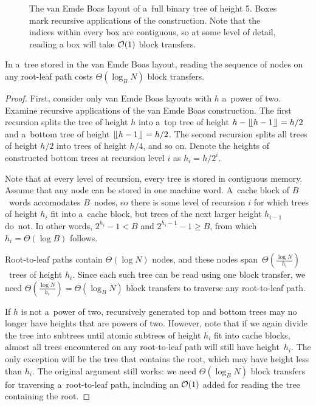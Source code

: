 \begin{figure}

\caption{The van Emde Boas layout of a~full binary tree of height 5.
Boxes mark recursive applications of the construction. Note that the indices
within every box are contiguous, so at some level of detail, reading
a box will take $\mathcal{O}(1)$ block transfers.}
\label{fig:veb_layout_5}
\end{figure}

\begin{theorem}
In a~tree stored in the van Emde Boas layout, reading the sequence of nodes
on any root-leaf path costs $\Theta(\log_B N)$ block transfers.
\end{theorem}

\begin{proof}
First, consider only van Emde Boas layouts with $h$ a~power of two.
Examine recursive applications of the van Emde Boas construction.
The first recursion splits the tree of height $h$ into a~top tree of height
$h-\lfloor \kern -0.22em \lfloor h-1\rfloor \kern -0.22em \rfloor=h/2$ and a~bottom tree of height $\lfloor \kern -0.22em \lfloor
h-1\rfloor \kern -0.22em \rfloor=h/2$. The second recursion splits all trees of height $h/2$
into trees of height $h/4$, and so on. Denote the heights of constructed bottom
trees at recursion level $i$ as $h_i=h/2^i$.

Note that at every level of recursion, every tree is stored in contiguous
memory. Assume that any node can be stored in one machine word. A~cache block
of $B$~words accomodates $B$~nodes, so there is some level of recursion $i$
for which trees of height $h_i$ fit into a~cache block, but trees of the next
larger height $h_{i-1}$ do~not. In other words, $2^{h_i}-1 < B$ and
$2^{h_i-1}-1\geq B$, from which $h_i=\Theta(\log B)$ follows.

Root-to-leaf paths contain $\Theta(\log N)$ nodes, and these nodes
span~$\Theta(\frac{\log N}{h_i})$~trees of height $h_i$. Since each such tree
can be read using one block transfer, we need
$\Theta(\frac{\log N}{h_i})=\Theta(\log_B N)$ block transfers to traverse any
root-to-leaf path.

If $h$ is not a~power of two, recursively generated top and bottom trees may no
longer have heights that are powers of two. However, note that if we again
divide the tree into subtrees until atomic subtrees of height $h_i$ fit into
cache blocks, almost all trees encountered on any root-to-leaf path will still
have height~$h_i$. The only exception will be the tree that contains the root,
which may have height less than $h_i$. The original argument still works:
we need $\Theta(\log_B N)$ block transfers for traversing a~root-to-leaf path,
including an $\mathcal{O}(1)$ added for reading the tree containing the root.
\end{proof}

